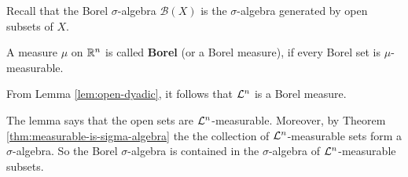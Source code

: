 Recall that the Borel $\sigma$-algebra $\mathcal{B}(X)$ is the $\sigma$-algebra generated by open subsets of $X$.

\begin{dfn}[]
  A measure $\mu$ on $\mathbb{R}^{n}$ is called \textbf{Borel} (or a Borel measure), if every Borel set is $\mu$-measurable.
\end{dfn}

\begin{rem}[] \label{rem:leb-is-borel}
  From Lemma \ref{lem:open-dyadic}, it follows that $\mathcal{L}^{n}$ is a Borel measure.

  The lemma says that the open sets are $\mathcal{L}^{n}$-measurable.
  Moreover, by Theorem \ref{thm:measurable-is-sigma-algebra} the the collection of $\mathcal{L}^{n}$-measurable sets form a $\sigma$-algebra.
  So the Borel $\sigma$-algebra is contained in the $\sigma$-algebra of $\mathcal{L}^{n}$-measurable subsets.
\end{rem}
